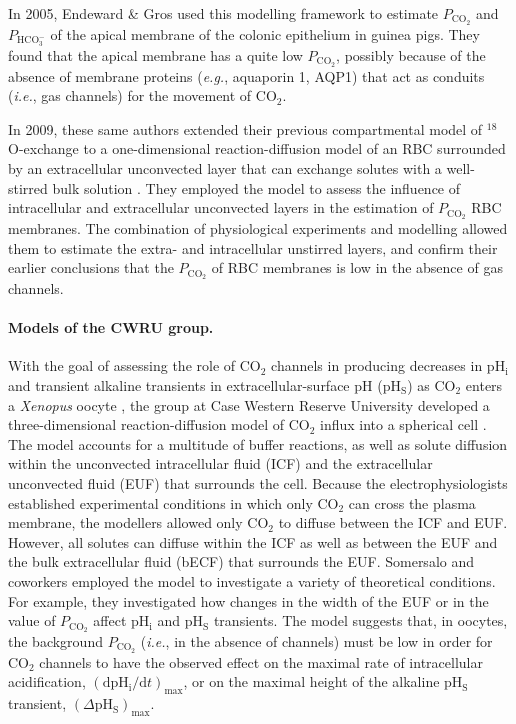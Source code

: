 \documentclass[fleqn,10pt]{physiome}
\begin{document}
In 2005, Endeward \& Gros used this modelling framework to estimate $P_\mathrm{CO_2}$ and $P_\mathrm{HCO_3^-}$ of the apical membrane of the colonic epithelium in guinea pigs. They found that the apical membrane has a quite low $P_\mathrm{CO_2}$, possibly because of the absence of membrane proteins (\emph{e.g.}, aquaporin 1, AQP1) that act as conduits (\emph{i.e.}, gas channels) for the movement of $\mathrm{CO_2}$.

In 2009, these same authors extended their previous compartmental model of $^{18}$O-exchange to a one-dimensional reaction-diffusion model of an RBC surrounded by an extracellular unconvected layer that can exchange solutes with a well-stirred bulk solution \citep{endeward2009extra}. They employed the model to assess the influence of intracellular and extracellular unconvected layers in the estimation of $P_\mathrm{CO_2}$ RBC membranes. The combination of physiological experiments and modelling allowed them to estimate the extra- and intracellular unstirred layers, and confirm their earlier conclusions that the $P_\mathrm{CO_2}$ of RBC membranes is low in the absence of gas channels.

\paragraph{Models of the CWRU group.}

With the goal of assessing the role of $\mathrm{CO_2}$ channels in producing decreases in $\mathrm{pH_i}$ and transient alkaline transients in extracellular-surface $\mathrm{pH}$ ($\mathrm{pH_S}$) as $\mathrm{CO_2}$ enters a \emph{Xenopus} oocyte \citep{endeward2006evidence,musa2009relative,musa2010using}, the group at Case Western Reserve University developed a three-dimensional reaction-diffusion model of $\mathrm{CO_2}$ influx into a spherical cell \citep{somersalo2012reaction}. The model accounts for a multitude of buffer reactions, as well as solute diffusion within the unconvected intracellular fluid (ICF) and the extracellular unconvected fluid (EUF) that surrounds the cell. Because the electrophysiologists established experimental conditions in which only $\mathrm{CO_2}$ can cross the plasma membrane, the modellers allowed only $\mathrm{CO_2}$ to diffuse between the ICF and EUF. However, all solutes can diffuse within the ICF as well as between the EUF and the bulk extracellular fluid (bECF) that surrounds the EUF. Somersalo and coworkers employed the model to investigate a variety of theoretical conditions. For example, they investigated how changes in the width of the EUF or in the value of $P_\mathrm{CO_2}$ affect $\mathrm{pH_i}$ and $\mathrm{pH_S}$ transients. The model suggests that, in oocytes, the background $P_\mathrm{CO_2}$ (\emph{i.e.}, in the absence of channels) must be low in order for $\mathrm{CO_2}$ channels to have the observed effect on the maximal rate of intracellular acidification, $(\mathrm{dpH_i}/\mathrm{d}t)_\mathrm{max}$, or on the maximal height of the alkaline $\mathrm{pH_S}$ transient, $(\Delta\mathrm{pH_S})_\mathrm{max}$.
\end{document}
